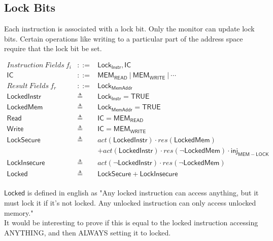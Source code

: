 \documentclass[12pt, letterpaper]{article}
\begin{document}

\subsection{Lock Bits}

Each instruction is associated with a lock bit.
Only the monitor can update lock bits.
Certain operations like writing to a particular part of the address space
require that the lock bit be set. 


\[
\begin{array}{rcl}
  \mathit{Instruction\ Fields}\ f_i &::=& \mathsf{Lock_{Instr}}, \mathsf{IC}\\
  \mathsf{IC} &::=& \mathsf{MEM_{READ}}\ |\ \mathsf{MEM_{WRITE}}\ |\ \cdots \\
  \mathit{Result\ Fields}\ f_r &::=& \mathsf{Lock_{MemAddr}}\\
  \mathsf{LockedInstr} &\triangleq& \mathsf{Lock_{Instr}} = \mathsf{TRUE} \\
  \mathsf{LockedMem} &\triangleq& \mathsf{Lock_{MemAddr}} = \mathsf{TRUE} \\
  \mathsf{Read} &\triangleq& \mathsf{IC} = \mathsf{MEM_{READ}}\\
  \mathsf{Write} &\triangleq& \mathsf{IC} = \mathsf{MEM_{WRITE}}\\
  \mathsf{LockSecure} &\triangleq& 
    act(\mathsf{LockedInstr})\cdot res(\mathsf{LockedMem})\\
    &&+
    act(\mathsf{LockedInstr})\cdot res(\neg \mathsf{LockedMem}) \cdot \mathsf{inj_{MEM-LOCK}} \\
  \mathsf{LockInsecure} &\triangleq&
    act(\neg \mathsf{LockedInstr})\cdot res(\neg \mathsf{LockedMem})\\
  \mathsf{Locked} &\triangleq& \mathsf{LockSecure} + \mathsf{LockInsecure}
\end{array}
\]\\
$\mathsf{Locked}$ is defined in english as "Any locked instruction can access anything, but it must lock it if it's not locked.  Any unlocked instruction can only access unlocked memory."\\
It would be interesting to prove if this is equal to the locked instruction accessing ANYTHING, and then ALWAYS setting it to locked.

\end{document}
